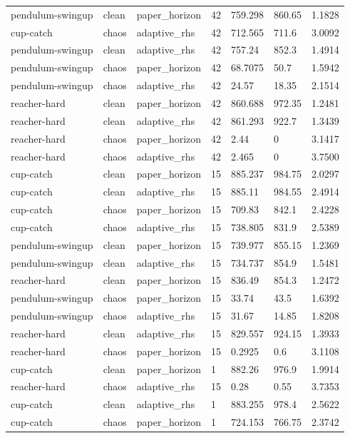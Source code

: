 \begin{tabular}{lllllll}
pendulum-swingup & clean & paper\_horizon & 42 & 759.298 & 860.65 & 1.1828 \\
cup-catch & chaos & adaptive\_rhs & 42 & 712.565 & 711.6 & 3.0092 \\
pendulum-swingup & clean & adaptive\_rhs & 42 & 757.24 & 852.3 & 1.4914 \\
pendulum-swingup & chaos & paper\_horizon & 42 & 68.7075 & 50.7 & 1.5942 \\
pendulum-swingup & chaos & adaptive\_rhs & 42 & 24.57 & 18.35 & 2.1514 \\
reacher-hard & clean & paper\_horizon & 42 & 860.688 & 972.35 & 1.2481 \\
reacher-hard & clean & adaptive\_rhs & 42 & 861.293 & 922.7 & 1.3439 \\
reacher-hard & chaos & paper\_horizon & 42 & 2.44 & 0 & 3.1417 \\
reacher-hard & chaos & adaptive\_rhs & 42 & 2.465 & 0 & 3.7500 \\
cup-catch & clean & paper\_horizon & 15 & 885.237 & 984.75 & 2.0297 \\
cup-catch & clean & adaptive\_rhs & 15 & 885.11 & 984.55 & 2.4914 \\
cup-catch & chaos & paper\_horizon & 15 & 709.83 & 842.1 & 2.4228 \\
cup-catch & chaos & adaptive\_rhs & 15 & 738.805 & 831.9 & 2.5389 \\
pendulum-swingup & clean & paper\_horizon & 15 & 739.977 & 855.15 & 1.2369 \\
pendulum-swingup & clean & adaptive\_rhs & 15 & 734.737 & 854.9 & 1.5481 \\
reacher-hard & clean & paper\_horizon & 15 & 836.49 & 854.3 & 1.2472 \\
pendulum-swingup & chaos & paper\_horizon & 15 & 33.74 & 43.5 & 1.6392 \\
pendulum-swingup & chaos & adaptive\_rhs & 15 & 31.67 & 14.85 & 1.8208 \\
reacher-hard & clean & adaptive\_rhs & 15 & 829.557 & 924.15 & 1.3933 \\
reacher-hard & chaos & paper\_horizon & 15 & 0.2925 & 0.6 & 3.1108 \\
cup-catch & clean & paper\_horizon & 1 & 882.26 & 976.9 & 1.9914 \\
reacher-hard & chaos & adaptive\_rhs & 15 & 0.28 & 0.55 & 3.7353 \\
cup-catch & clean & adaptive\_rhs & 1 & 883.255 & 978.4 & 2.5622 \\
cup-catch & chaos & paper\_horizon & 1 & 724.153 & 766.75 & 2.3742 \\

\end{tabular}
